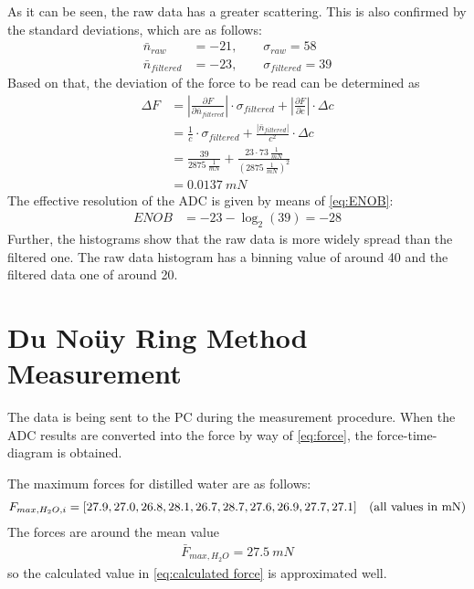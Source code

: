         As it can be seen, the raw data has a greater scattering. This is also confirmed by the standard deviations, which
        are as follows:
        \begin{align*}
            \bar{n}_{raw}       &=-21, \qquad \sigma_{raw}=58\\
            \bar{n}_{filtered}  &=-23, \qquad \sigma_{filtered}=39
        \end{align*}
        Based on that, the deviation of the force to be read can be determined as
        \begin{align}
            \Delta F    &=\left| \frac{\partial F}{\partial \bar{n}_{filtered}} \right| \cdot \sigma_{filtered} + \left| \frac{\partial F}{\partial c} \right| \cdot \Delta c \nonumber \\
                        &=\frac{1}{c} \cdot \sigma_{filtered} + \frac{\left|\bar{n}_{filtered}\right|}{c^2} \cdot \Delta c \nonumber \\
                        &=\frac{39}{\SI{2875}{\frac{1}{mN}}} + \frac{23 \cdot \SI{73}{\frac{1}{mN}}}{(\SI{2875}{\frac{1}{mN}})^2} \nonumber \\
                        &=\SI{0.0137}{mN}%
        \end{align}
        The effective resolution of the ADC is given by means of \cref{eq:ENOB}:
        \begin{align*}
            ENOB    &=-23-\log_2(39)=-28
        \end{align*}
        Further, the histograms show that the raw data is more widely spread than the filtered one. The raw data histogram
        has a binning value of around 40 and the filtered data one of around 20.
    \section{Du Noüy Ring Method Measurement}
        The data is being sent to the PC during the measurement procedure. When the ADC results are converted into the
        force by way of \cref{eq:force}, the force-time-diagram is obtained.

        The maximum forces for distilled water are as follows:
        \begin{align*}
            F_{max,H_2O,i}=[27.9, 27.0, 26.8, 28.1, 26.7, 28.7, 27.6, 26.9, 27.7, 27.1] \quad \text{(all values in \SI{}{mN})}
        \end{align*}
        The forces are around the mean value
        \begin{align}
            \bar{F}_{max,H_2O}=\SI{27.5}{mN}
        \end{align}
        so the calculated value in \cref{eq:calculated force} is approximated well.
